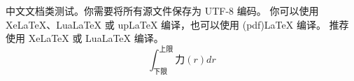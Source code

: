 \documentclass[UTF8]{ctexart}
\begin{document}
	中文文档类测试。你需要将所有源文件保存为 UTF-8 编码。
	你可以使用 XeLaTeX、LuaLaTeX 或 upLaTeX 编译，也可以使用 (pdf)LaTeX 编译。
	推荐使用 XeLaTeX 或 LuaLaTeX 编译。
	\[  \int_{下限}^{上限} 力(r)dr  \]
\end{document}

